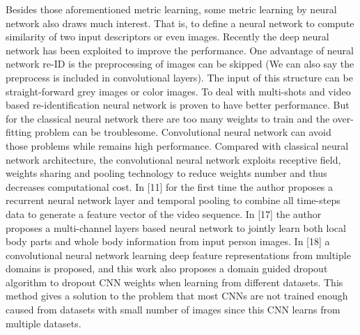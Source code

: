 Besides those aforementioned metric learning, some metric learning by neural network also draws much interest. That is, to define a neural network to compute similarity of two input descriptors or even images. Recently the deep neural network has been exploited to improve the performance. One advantage of neural network re-ID is the preprocessing of images can be skipped (We can also say the preprocess is included in convolutional layers). The input of this structure can be straight-forward grey images or color images. To deal with multi-shots and video based re-identification neural network is proven to have better performance. But for the classical neural network there are too many weights to train and the over-fitting problem can be troublesome. Convolutional neural network can avoid those problems while remains high performance. Compared with classical neural network architecture, the convolutional neural network exploits receptive field, weights sharing and pooling technology to reduce weights number and thus decreases computational cost. In [11] for the first time the author proposes a recurrent neural network layer and temporal pooling to combine all time-steps data to generate a feature vector of the video sequence. In [17] the author proposes a multi-channel layers based neural network to jointly learn both local body parts and whole body information from input person images.  In [18] a convolutional neural network learning deep feature representations from multiple domains is proposed, and this work also proposes a domain guided dropout algorithm to dropout CNN weights when learning from different datasets. This method gives a solution to the problem that most CNNs are not trained enough caused from datasets with small number of images since this CNN learns from multiple datasets.